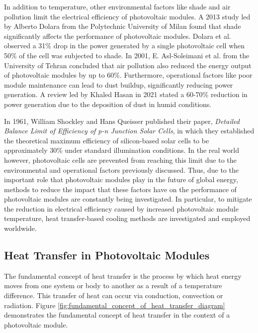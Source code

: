 \noindent In addition to temperature, other environmental factors like shade and air pollution limit the electrical efficiency of photovoltaic modules. A 2013 study led by Alberto Dolara from the Polytechnic University of Milan found that shade significantly affects the performance of photovoltaic modules. Dolara et al. observed a 31\% drop in the power generated by a single photovoltaic cell when 50\% of the cell was subjected to shade. \cite{Dolara2013ExperimentalModules} In 2001, E. Asl-Soleimani et al. from the University of Tehran concluded that air pollution also reduced the energy output of photovoltaic modules by up to 60\%. \cite{Asl-Soleimani2001TheTehran} Furthermore, operational factors like poor module maintenance can lead to dust buildup, significantly reducing power generation. A review led by Khaled Hasan in 2021 stated a 60-70\% reduction in power generation due to the deposition of dust in humid conditions. \cite{Hasan2022EffectsReview} \vspace{0.5em} 

\noindent In 1961, William Shockley and Hans Queisser published their paper, \textit{Detailed Balance Limit of Efficiency of p-n Junction Solar Cells}, in which they established the theoretical maximum efficiency of silicon-based solar cells to be approximately 30\% under standard illumination conditions. \cite{Shockley1961DetailedCells} In the real world however, photovoltaic cells are prevented from reaching this limit due to the environmental and operational factors previously discussed. Thus, due to the important role that photovoltaic modules play in the future of global energy, methods to reduce the impact that these factors have on the performance of photovoltaic modules are constantly being investigated. In particular, to mitigate the reduction in electrical efficiency caused by increased photovoltaic module temperature, heat transfer-based cooling methods are investigated and employed worldwide.\vspace{0.5em}

\pagebreak
\subsection{Heat Transfer in Photovoltaic Modules}
\noindent The fundamental concept of heat transfer is the process by which heat energy moves from one system or body to another as a result of a temperature difference. This transfer of heat can occur via conduction, convection or radiation. Figure \ref{fig:fundamental_concept_of_heat_transfer_diagram} demonstrates the fundamental concept of heat transfer in the context of a photovoltaic module.\par

